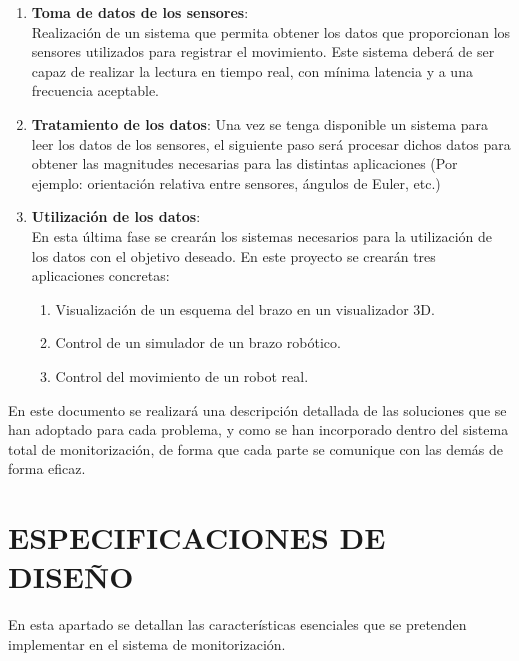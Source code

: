 \documentclass[12pt, a4paper]{report}
\begin{document}
\begin{enumerate}
\item \textbf{Toma de datos de los sensores}: \\
Realización de un sistema que permita obtener los datos que proporcionan los sensores utilizados para registrar el movimiento. Este sistema deberá de ser capaz de realizar la lectura en tiempo real, con mínima latencia y a una frecuencia aceptable. \\

\item \textbf{Tratamiento de los datos}: Una vez se tenga disponible un sistema para leer los datos de los sensores, el siguiente paso será procesar dichos datos para obtener las magnitudes necesarias para las distintas aplicaciones (Por ejemplo: orientación relativa entre sensores, ángulos de Euler, etc.)\\

\item \textbf{Utilización de los datos}: \\
En esta última fase se crearán los sistemas necesarios para la utilización de los datos con el objetivo deseado. En este proyecto se crearán tres aplicaciones concretas:

\begin{enumerate}

\item Visualización de un esquema del brazo en un visualizador 3D.

\item Control de un simulador de un brazo robótico.

\item Control del movimiento de un robot real.

\end{enumerate}

\end{enumerate}

En este documento se realizará una descripción detallada de las soluciones que se han adoptado para cada problema, y como se han incorporado dentro del sistema total de monitorización, de forma que cada parte se comunique con las demás de forma eficaz.

\chapter{ESPECIFICACIONES DE DISEÑO}

En esta apartado se detallan las características esenciales que se pretenden implementar en el sistema de monitorización.
\end{document}
